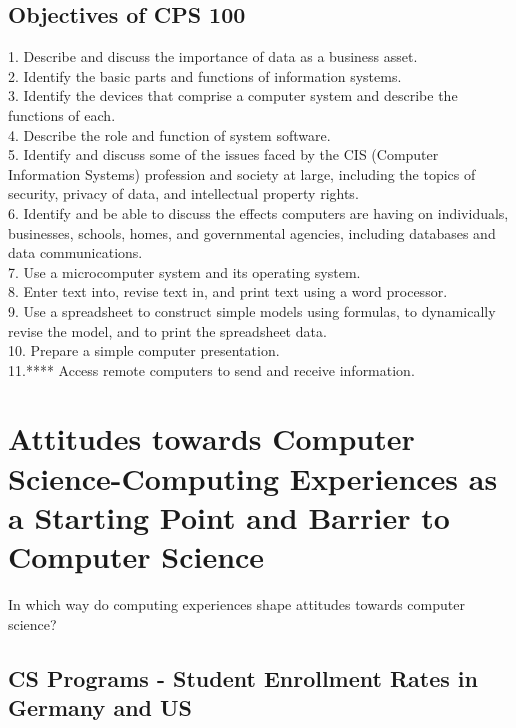 \documentclass[]{article}
\begin{document}
\subsection{Objectives of CPS 100}

1. Describe and discuss the importance of data as a
business asset.\\
2. Identify the basic parts and functions of
information systems.\\
3. Identify the devices that comprise a computer
system and describe the functions of each.\\
4. Describe the role and function of system software.\\
5. Identify and discuss some of the issues faced by
the CIS (Computer Information Systems)
profession and society at large, including the
topics of security, privacy of data, and intellectual
property rights.\\
6. Identify and be able to discuss the effects
computers are having on individuals, businesses,
schools, homes, and governmental agencies,
including databases and data communications.\\
7. Use a microcomputer system and its operating
system.\\
8. Enter text into, revise text in, and print text using a
word processor.\\
9. Use a spreadsheet to construct simple models
using formulas, to dynamically revise the model,
and to print the spreadsheet data.\\
10. Prepare a simple computer presentation.\\
11.**** Access remote computers to send and receive
information.\\

\maketitle

\section{Attitudes towards Computer
Science-Computing Experiences as a Starting Point
and Barrier to Computer Science}
In which way do computing experiences shape attitudes towards
computer science?

\subsection{CS Programs - Student Enrollment Rates in Germany and US }
\end{document}
